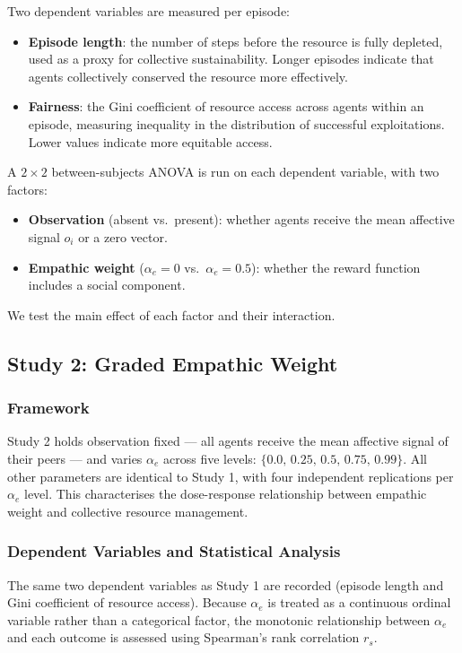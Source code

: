 Two dependent variables are measured per episode:
\begin{itemize}
    \item \textbf{Episode length}: the number of steps before the resource
          is fully depleted, used as a proxy for collective sustainability.
          Longer episodes indicate that agents collectively conserved the
          resource more effectively.
    \item \textbf{Fairness}: the Gini coefficient of resource access across
          agents within an episode, measuring inequality in the distribution
          of successful exploitations. Lower values indicate more equitable
          access.
\end{itemize}

A $2 \times 2$ between-subjects ANOVA is run on each dependent variable,
with two factors:
\begin{itemize}
    \item \textbf{Observation} (absent vs.\ present): whether agents receive
          the mean affective signal $o_i$ or a zero vector.
    \item \textbf{Empathic weight} ($\alpha_e = 0$ vs.\ $\alpha_e = 0.5$):
          whether the reward function includes a social component.
\end{itemize}
We test the main effect of each factor and their interaction.

\subsection{Study 2: Graded Empathic Weight}

\subsubsection{Framework}

Study 2 holds observation fixed --- all agents receive the mean affective
signal of their peers --- and varies $\alpha_e$ across five levels:
$\{0.0,\, 0.25,\, 0.5,\, 0.75,\, 0.99\}$. All other parameters are
identical to Study 1, with four independent replications per $\alpha_e$ level.
This characterises the dose-response relationship between empathic weight and
collective resource management.

\subsubsection{Dependent Variables and Statistical Analysis}

The same two dependent variables as Study 1 are recorded (episode length
and Gini coefficient of resource access). Because $\alpha_e$ is treated
as a continuous ordinal variable rather than a categorical factor, the
monotonic relationship between $\alpha_e$ and each outcome is assessed
using Spearman's rank correlation $r_s$.
